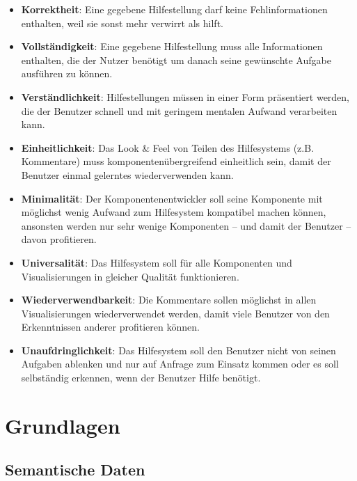 \documentclass[
	headsepline,
	footsepline,
	fontsize=12pt,
	bibliography=totoc
]{scrbook}
\begin{document}
\begin{itemize}
	\item\textbf{Korrektheit}: Eine gegebene Hilfestellung darf keine Fehlinformationen enthalten, weil sie sonst mehr verwirrt als hilft.
	\item\textbf{Vollständigkeit}: Eine gegebene Hilfestellung muss alle Informationen enthalten, die der Nutzer benötigt um danach seine gewünschte Aufgabe ausführen zu können.
	\item\textbf{Verständlichkeit}: Hilfestellungen müssen in einer Form präsentiert werden, die der Benutzer schnell und mit geringem mentalen Aufwand verarbeiten kann.
	\item\textbf{Einheitlichkeit}: Das Look \& Feel von Teilen des Hilfesystems (z.B. Kommentare) muss komponentenübergreifend einheitlich sein, damit der Benutzer einmal gelerntes wiederverwenden kann.
	\item\textbf{Minimalität}: Der Komponentenentwickler soll seine Komponente mit möglichst wenig Aufwand zum Hilfesystem kompatibel machen können, ansonsten werden nur sehr wenige Komponenten -- und damit der Benutzer -- davon profitieren.
	\item\textbf{Universalität}: Das Hilfesystem soll für alle Komponenten und Visualisierungen in gleicher Qualität funktionieren.
	\item\textbf{Wiederverwendbarkeit}: Die Kommentare sollen möglichst in allen Visualisierungen wiederverwendet werden, damit viele Benutzer von den Erkenntnissen anderer profitieren können.
	\item\textbf{Unaufdringlichkeit}: Das Hilfesystem soll den Benutzer nicht von seinen Aufgaben ablenken und nur auf Anfrage zum Einsatz kommen oder es soll selbständig erkennen, wenn der Benutzer Hilfe benötigt.
\end{itemize}

\section{Grundlagen}
\label{section:grundlagen}

\subsection{Semantische Daten}
\label{section:semantische_daten}

\end{document}

